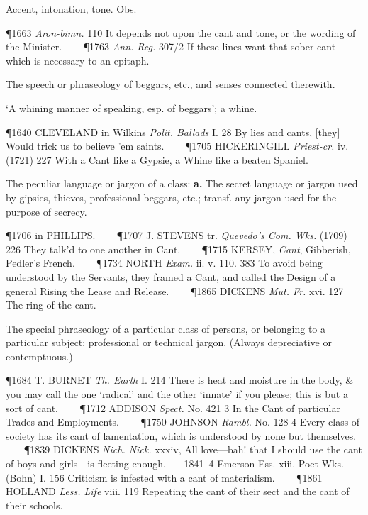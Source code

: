 \begin{description}[wide, labelwidth=!, labelindent=0pt]
\begin{myenumerate}
 Accent, intonation, tone. Obs.

\P 1663 \textit{Aron-bimn.}  110 It depends not upon the cant and tone, or the wording of the Minister.    
\P 1763 \textit{Ann. Reg.} 307/2 If these lines want that sober cant which is necessary to an epitaph.

 The speech or phraseology of beggars, etc., and senses connected therewith.

 ‘A whining manner of speaking, esp. of beggars’; a whine.

\P 1640 CLEVELAND in Wilkins \textit{Polit. Ballads} I. 28 By lies and cants, [they] Would trick us to believe 'em saints.    
\P 1705 HICKERINGILL  \textit{Priest-cr.} iv. (1721) 227 With a Cant like a Gypsie, a Whine like a beaten Spaniel.

 The peculiar language or jargon of a class: \textbf{a.} The secret language or jargon used by gipsies, thieves, professional beggars, etc.; transf. any jargon used for the purpose of secrecy.

\P 1706 in PHILLIPS.    
\P 1707 J. STEVENS tr. \textit{Quevedo's Com. Wks.} (1709) 226 They talk'd to one another in Cant.    
\P 1715 KERSEY,  \textit{Cant}, Gibberish, Pedler's French.    
\P 1734 NORTH  \textit{Exam.} ii. v. 110. 383 To avoid being understood by the Servants, they framed a Cant, and called the Design of a general Rising the Lease and Release.    
\P 1865 DICKENS  \textit{Mut. Fr.} xvi. 127 The ring of the cant.

 The special phraseology of a particular class of persons, or belonging to a particular subject; professional or technical jargon. (Always depreciative or contemptuous.)

\P 1684 T. BURNET  \textit{Th. Earth} I. 214 There is heat and moisture in the body, \& you may call the one ‘radical’ and the other ‘innate’ if you please; this is but a sort of cant.    
\P 1712 ADDISON  \textit{Spect.} No. 421 3 In the Cant of particular Trades and Employments.    
\P 1750 JOHNSON  \textit{Rambl.} No. 128 4 Every class of society has its cant of lamentation, which is understood by none but themselves.    
\P 1839 DICKENS  \textit{Nich. Nick.} xxxiv, All love—bah! that I should use the cant of boys and girls—is fleeting enough.    1841–4 Emerson Ess. xiii. Poet Wks. (Bohn) I. 156 Criticism is infested with a cant of materialism.    
\P 1861 HOLLAND  \textit{Less. Life} viii. 119 Repeating the cant of their sect and the cant of their schools.


\end{myenumerate}
\end{description}
